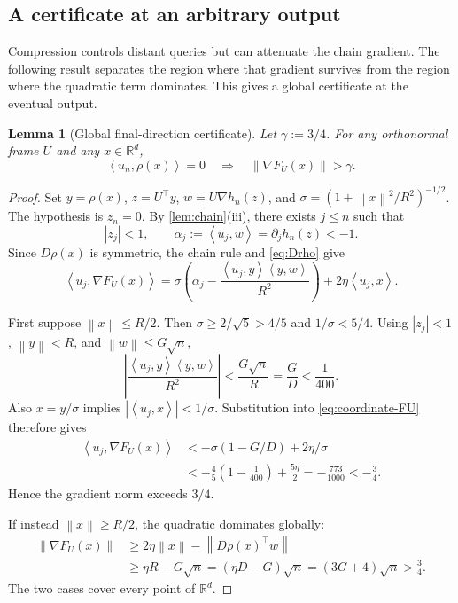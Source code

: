 \documentclass[11pt]{article}
\numberwithin{equation}{section}
\newtheorem{lemma}[lemma]{Lemma}
\theoremstyle{definition}
\theoremstyle{remark}
\newcommand{\R}{\mathbb{R}}
\newcommand{\norm}[1]{\left\lVert #1\right\rVert}
\newcommand{\ip}[2]{\left\langle #1,#2\right\rangle}
\begin{document}
\subsection{A certificate at an arbitrary output}

Compression controls distant queries but can attenuate the chain gradient.
The following result separates the region where that gradient survives
from the region where the quadratic term dominates. This gives a global
certificate at the eventual output.

\begin{lemma}[Global final-direction certificate]
\label{lem:certificate}
Let $\gamma:=3/4$. For any orthonormal frame $U$ and any $x\in\R^d$,
\begin{equation}
    \ip{u_n}{\rho(x)}=0
    \quad\Longrightarrow\quad
    \norm{\nabla F_U(x)}>\gamma.
    \label{eq:certificate}
\end{equation}
\end{lemma}

\begin{proof}
Set $y=\rho(x)$, $z=U^\top y$, $w=U\nabla h_n(z)$, and
$\sigma=(1+\norm{x}^2/R^2)^{-1/2}$. The hypothesis is $z_n=0$.
By \cref{lem:chain}(iii), there exists $j\leq n$ such that
\begin{equation}
    |z_j|<1,\qquad
    \alpha_j:=\ip{u_j}{w}=\partial_jh_n(z)<-1.
    \label{eq:bad-coordinate}
\end{equation}
Since $D\rho(x)$ is symmetric, the chain rule and \eqref{eq:Drho} give
\begin{equation}
    \ip{u_j}{\nabla F_U(x)}
    =\sigma\left(\alpha_j-
           \frac{\ip{u_j}{y}\ip{y}{w}}{R^2}\right)
       +2\eta\ip{u_j}{x}.
    \label{eq:coordinate-FU}
\end{equation}

First suppose $\norm{x}\leq R/2$. Then
$\sigma\geq2/\sqrt5>4/5$ and $1/\sigma<5/4$.
Using $|z_j|<1$, $\norm{y}<R$, and $\norm{w}\leq G\sqrt n$,
\[
    \left|\frac{\ip{u_j}{y}\ip{y}{w}}{R^2}\right|
       <\frac{G\sqrt n}{R}=\frac GD<\frac1{400}.
\]
Also $x=y/\sigma$ implies $|\ip{u_j}{x}|<1/\sigma$.
Substitution into \eqref{eq:coordinate-FU} therefore gives
\begin{align*}
    \ip{u_j}{\nabla F_U(x)}
    &<-\sigma(1-G/D)+2\eta/\sigma\\
    &<-\frac45\left(1-\frac1{400}\right)+\frac{5\eta}{2}
      =-\frac{773}{1000}<-\frac34.
\end{align*}
Hence the gradient norm exceeds $3/4$.

If instead $\norm{x}\geq R/2$, the quadratic dominates globally:
\begin{align*}
    \norm{\nabla F_U(x)}
    &\geq2\eta\norm{x}-\norm{D\rho(x)^\top w}\\
    &\geq\eta R-G\sqrt n
      =(\eta D-G)\sqrt n
      =(3G+4)\sqrt n>\frac34.
\end{align*}
The two cases cover every point of $\R^d$.
\end{proof}
\end{document}
